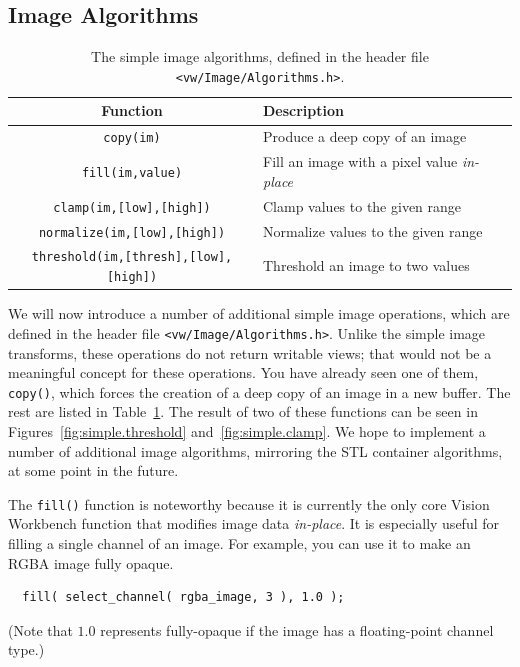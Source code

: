 \subsection{Image Algorithms}

\begin{table}[t]\begin{centering}
\begin{tabular}{|c|l|l|} \hline
Function & Description \\ \hline \hline
\verb#copy(im)# & Produce a deep copy of an image \\ \hline
\verb#fill(im,value)# & Fill an image with a pixel value {\it in-place} \\ \hline
\verb#clamp(im,[low],[high])# & Clamp values to the given range \\ \hline
\verb#normalize(im,[low],[high])# & Normalize values to the given range \\ \hline
\verb#threshold(im,[thresh],[low],[high])# & Threshold an image to two values \\ \hline
\end{tabular}
\caption{The simple image algorithms, defined in the header file {\tt <vw/Image/Algorithms.h>}.}
\label{tbl:image-algorithms}
\end{centering}\end{table}

We will now introduce a number of additional simple image operations,
which are defined in the header file \verb#<vw/Image/Algorithms.h>#.
Unlike the simple image transforms, these operations do not return
writable views; that would not be a meaningful concept for these
operations.  You have already seen one of them, \verb#copy()#, which
forces the creation of a deep copy of an image in a new buffer.  The
rest are listed in Table~\ref{tbl:image-algorithms}.  The result of
two of these functions can be seen in
Figures~\ref{fig:simple.threshold} and~\ref{fig:simple.clamp}.  We hope to
implement a number of additional image algorithms, mirroring the STL
container algorithms, at some point in the future.

The \verb#fill()# function is noteworthy because it is currently the
only core Vision Workbench function that modifies image data {\it
  in-place}.  It is especially useful for filling a single channel of
an image.  For example, you can use it to make an RGBA image fully
opaque.
\begin{verbatim}
  fill( select_channel( rgba_image, 3 ), 1.0 );
\end{verbatim}
(Note that $1.0$ represents fully-opaque if the image has a 
floating-point channel type.)


